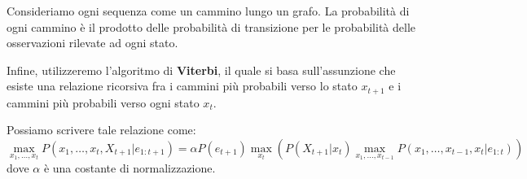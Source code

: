 \begin{itemize}
          Consideriamo ogni sequenza come un cammino lungo un grafo. La probabilità
          di ogni cammino è il prodotto delle probabilità di transizione per le
          probabilità delle osservazioni rilevate ad ogni stato.

          Infine, utilizzeremo l'algoritmo di \textbf{Viterbi}, il quale si basa
          sull'assunzione che esiste una relazione ricorsiva fra i cammini più
          probabili verso lo stato $x_{t+1}$ e i cammini più probabili verso
          ogni stato $x_t$.

          Possiamo scrivere tale relazione come:
          \begin{equation}
              \max _{x_1,\dots, x_t} P(x_1,\dots,x_t,X_{t+1}|e_{1:t+1}) = \alpha
              P(e_{t+1})\max_{x_t} \left(P(X_{t+1}|x_t)\max_{x_1,\dots,x_{t-1}}
              P(x_1,\dots,x_{t-1},x_t|e_{1:t})\right)
          \end{equation}
          dove $\alpha$ è una costante di normalizzazione.


\end{itemize}
